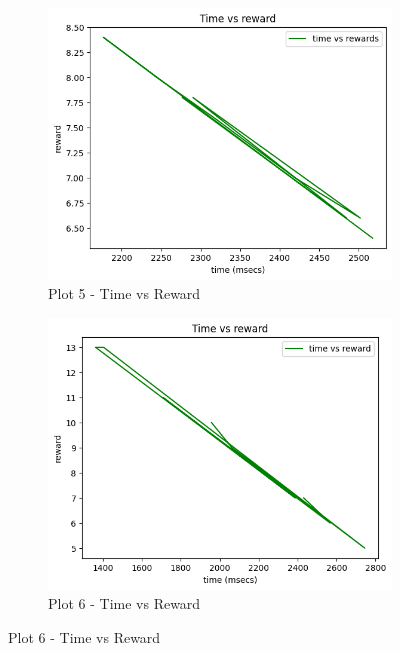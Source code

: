 \documentclass[conference]{IEEEtran}
\begin{document}
\begin{figure}[htbp]
  \centering
  \begin{subfigure}[t]{0.45\linewidth}
    \centering
    \includegraphics[width=\linewidth]{Plots/tvr 1.png}
    \caption{Plot 5 - Time vs Reward}
    \label{fig:figure89}
  \end{subfigure}
  \hfill
  \begin{subfigure}[t]{0.45\linewidth}
    \centering
    \includegraphics[width=\linewidth]{Plots/trv2.png}
    \caption{Plot 6 - Time vs Reward}
    \label{fig:figure88}
  \end{subfigure}
  

\end{figure}
\end{document}
